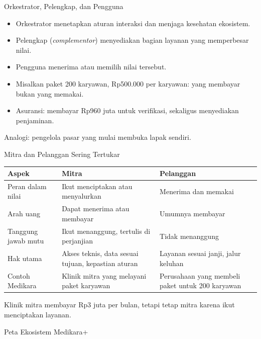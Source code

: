 \documentclass[aspectratio=169, table, 12pt]{beamer}
\begin{document}
\begin{frame}{{\Large Orkestrator, Pelengkap, dan Pengguna}}
  \vspace{10pt}
  \begin{itemize}
    \item Orkestrator menetapkan aturan interaksi dan menjaga kesehatan ekosistem.
    \item Pelengkap (\textit{complementor}) menyediakan bagian layanan yang memperbesar nilai.
    \item Pengguna menerima atau memilih nilai tersebut.
    \item Misalkan paket 200 karyawan, Rp500.000 per karyawan: yang membayar bukan yang memakai.
    \item Asuransi: membayar Rp960 juta untuk verifikasi, sekaligus menyediakan penjaminan.
  \end{itemize}
  \vspace{6pt}
  {\small Analogi: pengelola pasar yang mulai membuka lapak sendiri.}
\end{frame}

\begin{frame}{{\Large Mitra dan Pelanggan Sering Tertukar}}
  \footnotesize
  \begin{tabularx}{\textwidth}{>{\raggedright\arraybackslash}p{3.3cm}
      >{\raggedright\arraybackslash}X >{\raggedright\arraybackslash}X}
    \hline
    \textbf{Aspek} & \textbf{Mitra} & \textbf{Pelanggan} \\ \hline
    Peran dalam nilai & Ikut menciptakan atau menyalurkan & Menerima dan memakai \\ \hline
    Arah uang & Dapat menerima atau membayar & Umumnya membayar \\ \hline
    Tanggung jawab mutu & Ikut menanggung, tertulis di perjanjian & Tidak menanggung \\ \hline
    Hak utama & Akses teknis, data sesuai tujuan, kepastian aturan & Layanan sesuai janji, jalur keluhan \\ \hline
    Contoh Medikara & Klinik mitra yang melayani paket karyawan & Perusahaan yang membeli paket untuk 200 karyawan \\ \hline
  \end{tabularx}

  \vspace{8pt}
  \small Klinik mitra membayar Rp3 juta per bulan, tetapi tetap mitra karena ikut menciptakan layanan.
\end{frame}

\begin{frame}{{\Large Peta Ekosistem Medikara+}}
  \centering
\end{frame}
\end{document}
